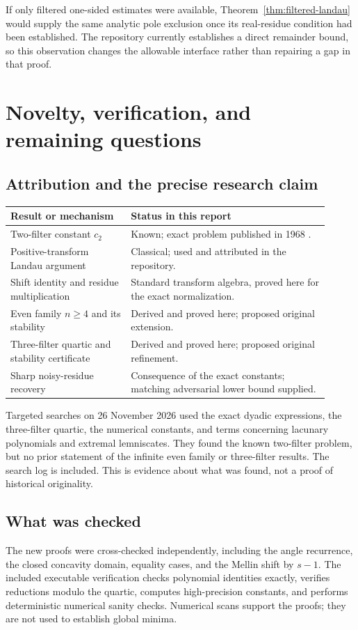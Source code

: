 \documentclass[11pt,a4paper]{article}
\theoremstyle{definition}\newtheorem{definition}[theorem]{Definition}
\theoremstyle{remark}\newtheorem{remark}[theorem]{Remark}
\begin{document}
If only filtered one-sided estimates were available, Theorem~\ref{thm:filtered-landau} would supply the same analytic pole exclusion once its real-residue condition had been established. The repository currently establishes a direct remainder bound, so this observation changes the allowable interface rather than repairing a gap in that proof.

\section{Novelty, verification, and remaining questions}
\subsection{Attribution and the precise research claim}
\begin{center}
\begin{tabular}{p{0.34\linewidth}p{0.57\linewidth}}
\toprule
Result or mechanism & Status in this report\\
\midrule
Two-filter constant $c_2$ & Known; exact problem published in 1968 \cite{contests}.\\
Positive-transform Landau argument & Classical; used and attributed in the repository.\\
Shift identity and residue multiplication & Standard transform algebra, proved here for the exact normalization.\\
Even family $n\ge4$ and its stability & Derived and proved here; proposed original extension.\\
Three-filter quartic and stability certificate & Derived and proved here; proposed original refinement.\\
Sharp noisy-residue recovery & Consequence of the exact constants; matching adversarial lower bound supplied.\\
\bottomrule
\end{tabular}
\end{center}
Targeted searches on 26 November 2026 used the exact dyadic expressions, the three-filter quartic, the numerical constants, and terms concerning lacunary polynomials and extremal lemniscates. They found the known two-filter problem, but no prior statement of the infinite even family or three-filter results. The search log is included. This is evidence about what was found, not a proof of historical originality.

\subsection{What was checked}
The new proofs were cross-checked independently, including the angle recurrence, the closed concavity domain, equality cases, and the Mellin shift by $s-1$. The included executable verification checks polynomial identities exactly, verifies reductions modulo the quartic, computes high-precision constants, and performs deterministic numerical sanity checks. Numerical scans support the proofs; they are not used to establish global minima.
\end{document}
